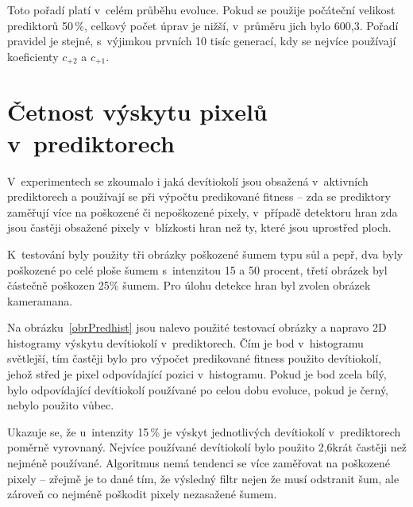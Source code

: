 Toto pořadí platí v~celém průběhu evoluce. Pokud se použije počáteční velikost prediktorů 50\,\%, celkový počet úprav je nižší, v~průměru jich bylo 600,3. Pořadí pravidel je stejné, s~výjimkou prvních 10 tisíc generací, kdy se nejvíce používají koeficienty $c_{+2}$ a $c_{+1}$.



\section{Četnost výskytu pixelů v~prediktorech}
\label{secExpPredhist}

V~experimentech se zkoumalo i jaká devítiokolí jsou obsažená v~aktivních prediktorech a používají se při výpočtu predikované fitness -- zda se prediktory zaměřují více na poškozené či nepoškozené pixely, v~případě detektoru hran zda jsou častěji obsažené pixely v~blízkosti hran než ty, které jsou uprostřed ploch.

K~testování byly použity tři obrázky poškozené šumem typu sůl a pepř, dva byly poškozené po celé ploše šumem s~intenzitou 15 a 50 procent, třetí obrázek byl částečně poškozen 25\% šumem. Pro úlohu detekce hran byl zvolen obrázek kameramana.

Na obrázku~\ref{obrPredhist} jsou nalevo použité testovací obrázky a napravo 2D histogramy výskytu devítiokolí v~prediktorech. Čím je bod v~histogramu světlejší, tím častěji bylo pro výpočet predikované fitness použito devítiokolí, jehož střed je pixel odpovídající pozici v~histogramu. Pokud je bod zcela bílý, bylo odpovídající devítiokolí používané po celou dobu evoluce, pokud je černý, nebylo použito vůbec.

Ukazuje se, že u~intenzity 15\,\% je výskyt jednotlivých devítiokolí v~prediktorech poměrně vyrovnaný. Nejvíce používané devítiokolí bylo použito 2,6krát častěji než nejméně používané. Algoritmus nemá tendenci se více zaměřovat na poškozené pixely -- zřejmě je to dané tím, že výsledný filtr nejen že musí odstranit šum, ale zároveň co nejméně poškodit pixely nezasažené šumem.

